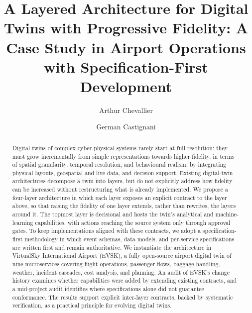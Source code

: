 \documentclass[runningheads]{llncs}
\begin{document}
%
\title{A Layered Architecture for Digital Twins with Progressive Fidelity: A Case Study in Airport Operations with Specification-First Development}
%
%
\author{Arthur Chevallier \and German Castignani}
%
%
%
\maketitle %
%
\begin{abstract}
Digital twins of complex cyber-physical systems rarely start at full resolution: they must grow incrementally from simple representations towards higher fidelity, in terms of spatial granularity, temporal resolution, and behavioural realism, by integrating physical layouts, geospatial and live data, and decision support. Existing digital-twin architectures decompose a twin into layers, but do not explicitly address how fidelity can be increased without restructuring what is already implemented. We propose a four-layer architecture in which each layer exposes an explicit contract to the layer above, so that raising the fidelity of one layer extends, rather than rewrites, the layers around it. The topmost layer is decisional and hosts the twin's analytical and machine-learning capabilities, with actions reaching the source system only through approval gates. To keep implementations aligned with these contracts, we adopt a specification-first methodology in which event schemas, data models, and per-service specifications are written first and remain authoritative. We instantiate the architecture in VirtualSky International Airport (EVSK), a fully open-source airport digital twin of nine microservices covering flight operations, passenger flows, baggage handling, weather, incident cascades, cost analysis, and planning. An audit of EVSK's change history examines whether capabilities were added by extending existing contracts, and a mid-project audit identifies where specifications alone did not guarantee conformance. The results support explicit inter-layer contracts, backed by systematic verification, as a practical principle for evolving digital twins.

\end{abstract}
%
%
%

\end{document}

